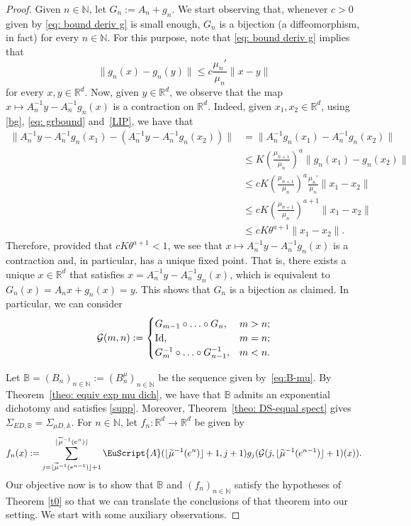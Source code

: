 \documentclass[reqno, a4paper, 10pt]{amsart}
\theoremstyle{plain}
\numberwithin{equation}{section}
\theoremstyle{remark}
\def\N{\mathbb{N}}
\def\cA{\EuScript{A}}
\def\R{\mathbb{R}}
\def\Id{\text{\rm Id}}
\begin{document}
\begin{proof} Given $n\in \N$, let $G_n:=A_n+g_n$. We start observing that, whenever $c>0$ given by \eqref{eq: bound deriv g} is small enough, $G_n$ is a bijection (a diffeomorphism, in fact) for every $n\in \N$. For this purpose, note that \eqref{eq: bound deriv g} implies that
\begin{equation}\label{LIP}
    \|g_n(x)-g_n(y)\|\leq c\frac{\mu_n'}{\mu_n}\|x-y\|
\end{equation}
for every $x,y\in \R^d$. Now, given $y\in \R ^d$, we observe that the map $x\mapsto A_n^{-1}y-A_n^{-1}g_n(x)$ is a contraction on $\R^d$. Indeed, given $x_1, x_2\in \R ^d$, using \eqref{bg}, \eqref{eq: grbound} and~\eqref{LIP}, we have that
\[
\begin{split}
\|A_n^{-1}y-A_n^{-1}g_n(x_1)-(A_n^{-1}y-A_n^{-1}g_n(x_2))\| &=\|A_n^{-1}g_n(x_1)-A_n^{-1}g_n(x_2)\| \\
&\le K \left (\frac{\mu_{n+1}}{\mu_n}\right )^a \|g_n(x_1)-g_n(x_2)\| \\
&\le cK\left (\frac{\mu_{n+1}}{\mu_n}\right )^a \frac{\mu_{n}'}{\mu_n}\|x_1-x_2\| \\
&\le cK\left (\frac{\mu_{n+1}}{\mu_n}\right )^{a+1}\|x_1-x_2\| \\
&\le cK\theta^{a+1}\|x_1-x_2\|.
\end{split}
\]
Therefore, provided that $cK\theta^{a+1}<1$, we see that
$x\mapsto A_n^{-1}y-A_n^{-1}g_n(x)$ is a contraction and, in particular, has a unique fixed point. That is, there exists a unique $x\in \R^d$ that satisfies $x=A_n^{-1}y-A_n^{-1}g_n(x)$, which is equivalent to $G_ n(x)=A_n x+g_n(x)=y$. This shows that $G_n$ is a bijection as claimed. In particular, we can consider
\begin{align*}
\mathcal G(m,n):=
\begin{cases}
G_{m-1} \circ \ldots \circ G_n, & m>n;\\
\Id, & m=n;\\
G_{m}^{-1} \circ \ldots \circ G_{n-1}^{-1}, & m<n.
\end{cases}
\end{align*}



Let $\mathbb B=(B_n)_{n\in \N}:=(B^\mu_n)_{n\in \N}$ be the sequence given by~\eqref{eq:B-mu}. By Theorem~\ref{theo: equiv exp mu dich}, we have that $\mathbb B$ admits an exponential dichotomy and satisfies \eqref{supp}.
Moreover, Theorem~\ref{theo: DS-equal spect} gives $\Sigma_{ED, \mathbb B}=\Sigma_{\mu D, \mathbb A}$. For $n\in \N$, let $f_n\colon \R^d\to \R^d$ be given by
\begin{equation}\label{fnx}
f_n(x):=\sum_{j=\lfloor \widetilde{\mu}^{-1}(e^{n-1})\rfloor+1}^{\lfloor \widetilde{\mu}^{-1}(e^{n})\rfloor}\cA(\lfloor \widetilde{\mu}^{-1}(e^{n})\rfloor+1, j+1)g_j (\mathcal G(j, \lfloor \widetilde{\mu}^{-1}(e^{n-1})\rfloor+1)(x)). 
\end{equation}
Our objective now is to show that $\mathbb B$ and $(f_n)_{n\in \N}$ satisfy the hypotheses of Theorem \ref{t0} so that we can translate the conclusions of that theorem into our setting. We start with some auxiliary observations.


\end{proof}
\end{document}

